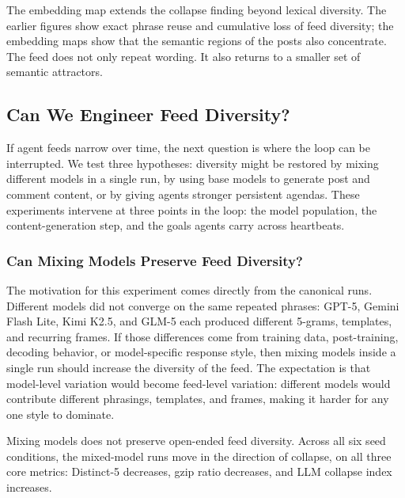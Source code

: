 \documentclass[11pt]{article}
\begin{document}
The embedding map extends the collapse finding beyond lexical diversity. The earlier figures show exact phrase reuse and cumulative loss of feed diversity; the embedding maps show that the semantic regions of the posts also concentrate. The feed does not only repeat wording. It also returns to a smaller set of semantic attractors.

\subsection{Can We Engineer Feed Diversity?}
\label{subsec:engineering-diversity}

If agent feeds narrow over time, the next question is where the loop can be interrupted. We test three hypotheses: diversity might be restored by mixing different models in a single run, by using base models to generate post and comment content, or by giving agents stronger persistent agendas. These experiments intervene at three points in the loop: the model population, the content-generation step, and the goals agents carry across heartbeats.

\subsubsection{Can Mixing Models Preserve Feed Diversity?}
\label{subsubsec:mixing-models}

The motivation for this experiment comes directly from the canonical runs. Different models did not converge on the same repeated phrases: GPT-5, Gemini Flash Lite, Kimi K2.5, and GLM-5 each produced different 5-grams, templates, and recurring frames. If those differences come from training data, post-training, decoding behavior, or model-specific response style, then mixing models inside a single run should increase the diversity of the feed. The expectation is that model-level variation would become feed-level variation: different models would contribute different phrasings, templates, and frames, making it harder for any one style to dominate.

Mixing models does not preserve open-ended feed diversity. Across all six seed conditions, the mixed-model runs move in the direction of collapse, on all three core metrics: Distinct-5 decreases, gzip ratio decreases, and LLM collapse index increases.
\end{document}

